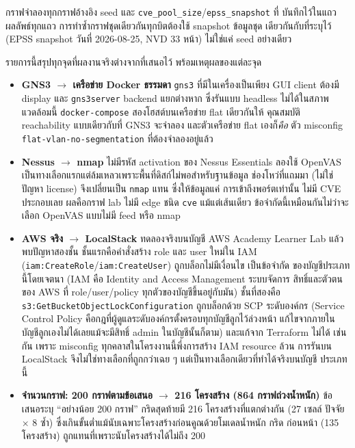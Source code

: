 กราฟจำลองทุกกราฟอ้างอิง seed และ \texttt{cve\_pool\_size}/\texttt{epss\_snapshot} ที่
บันทึกไว้ในแถวผลลัพธ์ทุกแถว การทำซ้ำกราฟชุดเดียวกันทุกบิตต้องใช้ snapshot ข้อมูลชุด
เดียวกันกับที่ระบุไว้ (EPSS snapshot วันที่ 2026-08-25, NVD 33 หน้า) ไม่ใช่แค่ seed อย่างเดียว


รายการนี้สรุปทุกจุดที่ผลงานจริงต่างจากที่เสนอไว้ พร้อมเหตุผลของแต่ละจุด

\begin{itemize}[leftmargin=1.6em]
\item \textbf{GNS3 $\to$ เครือข่าย Docker ธรรมดา} \texttt{gns3} ที่มีในเครื่องเป็นเพียง GUI
client ต้องมี display และ \texttt{gns3server} backend แยกต่างหาก ซึ่งรันแบบ headless
ไม่ได้ในสภาพแวดล้อมนี้ \texttt{docker-compose} สองโฮสต์บนเครือข่าย flat เดียวกันให้
คุณสมบัติ reachability แบบเดียวกับที่ GNS3 จะจำลอง และตัวเครือข่าย flat เองก็\emph{คือ}
ตัว misconfig \texttt{flat-vlan-no-segmentation} ที่ต้องจำลองอยู่แล้ว
\item \textbf{Nessus $\to$ nmap} ไม่มีรหัส activation ของ Nessus Essentials
ลองใช้ OpenVAS เป็นทางเลือกแรกแต่ล้มเหลวเพราะพื้นที่ดิสก์ไม่พอสำหรับฐานข้อมูล
ช่องโหว่ที่แถมมา (ไม่ใช่ปัญหา license) จึงเปลี่ยนเป็น \texttt{nmap} แทน ซึ่งให้ข้อมูลแค่
การเข้าถึงพอร์ตเท่านั้น ไม่มี CVE ประกอบเลย ผลคือกราฟ lab ไม่มี edge ชนิด
\texttt{cve} แม้แต่เส้นเดียว ข้อจำกัดนี้เหมือนกันไม่ว่าจะเลือก OpenVAS แบบไม่มี feed
หรือ nmap
\item \textbf{AWS จริง $\to$ LocalStack} ทดลองจริงบนบัญชี AWS Academy Learner Lab
แล้วพบปัญหาสองชั้น ชั้นแรกคือคำสั่งสร้าง role และ user ใหม่ใน IAM
(\texttt{iam:CreateRole}/\texttt{iam:CreateUser}) ถูกบล็อกไม่มีเงื่อนไข เป็นข้อจำกัด
ของบัญชีประเภทนี้โดยเจตนา (IAM คือ Identity and Access Management ระบบจัดการ
สิทธิ์และตัวตนของ AWS ที่ role/user/policy ทุกตัวของบัญชีขึ้นอยู่กับมัน) ชั้นที่สองคือ
\texttt{s3:GetBucketObjectLockConfiguration} ถูกบล็อกด้วย SCP ระดับองค์กร (Service
Control Policy คือกฎที่ผู้ดูแลระดับองค์กรตั้งครอบทุกบัญชีลูกไว้ล่วงหน้า แก้ไขจากภายใน
บัญชีลูกเองไม่ได้เลยแม้จะมีสิทธิ์ admin ในบัญชีนั้นก็ตาม) และแก้จาก Terraform ไม่ได้
เช่นกัน เพราะ misconfig ทุกคลาสในโครงงานนี้พึ่งการสร้าง IAM resource ล้วน การรันบน
LocalStack จึงไม่ใช่ทางเลือกที่ถูกกว่าเฉย ๆ แต่เป็นทางเลือกเดียวที่ทำได้จริงบนบัญชี
ประเภทนี้
\item \textbf{จำนวนกราฟ: 200 กราฟตามข้อเสนอ $\to$ 216 โครงสร้าง (864 กราฟถ่วงน้ำหนัก)}
ข้อเสนอระบุ ``อย่างน้อย 200 กราฟ'' กริดสุดท้ายมี 216 โครงสร้างที่แตกต่างกัน (27 เซลล์
ปัจจัย $\times$ 8 ซ้ำ) ซึ่งเกินขั้นต่ำแม้นับเฉพาะโครงสร้างก่อนคูณด้วยโมเดลน้ำหนัก กริด
ก่อนหน้า (135 โครงสร้าง) ถูกแทนที่เพราะนับโครงสร้างได้ไม่ถึง 200
\end{itemize}
